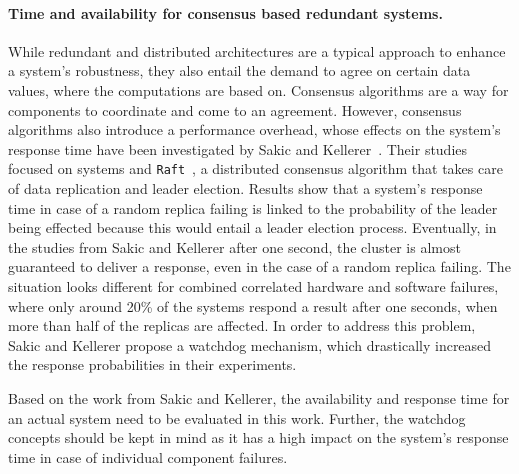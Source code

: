 \paragraph{Time and availability for consensus based redundant systems.}
While redundant and distributed architectures are a typical approach to enhance a system's robustness, they also entail the demand to agree on certain data values, where the computations are based on.
Consensus algorithms are a way for components to coordinate and come to an agreement.
However, consensus algorithms also introduce a performance overhead, whose effects on the system's response time have been investigated by Sakic and Kellerer~\cite{SakicTimeInConsensus}.
Their studies focused on  systems and \texttt{Raft}~\cite{RaftConsensusPaper}, a distributed consensus algorithm that takes care of data replication and leader election.
Results show that a system's response time in case of a random replica failing is linked to the probability of the leader being effected because this would entail a leader election process.
Eventually, in the studies from Sakic and Kellerer after one second, the cluster is almost guaranteed to deliver a response, even in the case of a random replica failing.
The situation looks different for combined correlated hardware and software failures, where only around 20\% of the systems respond a result after one seconds, when more than half of the replicas are affected.
In order to address this problem, Sakic and Kellerer propose a watchdog mechanism, which drastically increased the response probabilities in their experiments.

Based on the work from Sakic and Kellerer, the availability and response time for an actual system need to be evaluated in this work.
Further, the watchdog concepts should be kept in mind as it has a high impact on the system's response time in case of individual component failures.